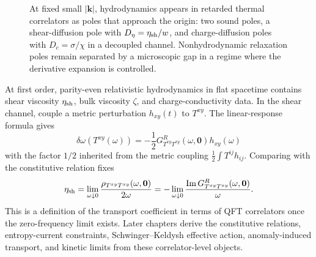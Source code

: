 \begin{figure}[H]
\centering
{}
\caption{At fixed small \(|\mathbf k|\), hydrodynamics appears in retarded
thermal correlators as poles that approach the origin: two sound poles, a
shear-diffusion pole with \(D_\eta=\eta_{\rm sh}/w\), and charge-diffusion
poles with \(D_c=\sigma/\chi\) in a decoupled channel.  Nonhydrodynamic
relaxation poles remain separated by a microscopic gap in a regime where the
derivative expansion is controlled.}
\label{fig:thermal-hydrodynamic-variables}
\end{figure}

At first order, parity-even relativistic hydrodynamics in flat spacetime
contains shear viscosity \(\eta_{\rm sh}\), bulk viscosity \(\zeta\), and
charge-conductivity data.  In the shear channel, couple a metric perturbation
\(h_{xy}(t)\) to \(T^{xy}\).  The linear-response formula gives
\[
  \delta\omega(T^{xy}(\omega))
  =
  -\frac12G^R_{T^{xy}T^{xy}}(\omega,\mathbf0)h_{xy}(\omega)
  \]
with the factor \(1/2\) inherited from the metric coupling
\(\frac12\int T^{ij}h_{ij}\).  Comparing with the constitutive relation fixes
\begin{equation}
  \eta_{\rm sh}
  =
  \lim_{\omega\downarrow0}
  \frac{\rho_{T^{xy}T^{xy}}(\omega,\mathbf0)}{2\omega}
  =
  -\lim_{\omega\downarrow0}
  \frac{\operatorname{Im}G^R_{T^{xy}T^{xy}}(\omega,\mathbf0)}{\omega}.
  \label{eq:thermal-shear-kubo}
\end{equation}
This is a definition of the transport coefficient in terms of QFT correlators
once the zero-frequency limit exists.  Later chapters derive the
constitutive relations, entropy-current constraints, Schwinger--Keldysh
effective action, anomaly-induced transport, and kinetic limits from these
correlator-level objects.

